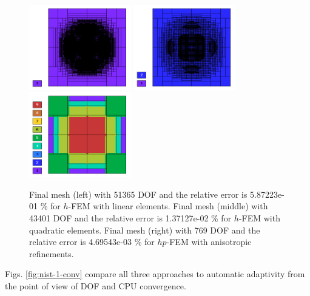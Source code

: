 \documentclass[12pt]{elsarticle}
\begin{document}
\begin{figure}[!ht]
\centering
\vspace{-7mm}
\includegraphics[height=3.7cm]{nist/nist-1/mesh_h1_aniso.png}
\includegraphics[height=3.7cm]{nist/nist-1/mesh_h2_aniso.png}
\includegraphics[height=3.7cm]{nist/nist-1/mesh_hp_aniso.png}
\vspace{-3mm}
\caption{
Final mesh (left) with 51365 DOF and the relative error is 5.87223e-01 \% for $h$-FEM with linear elements.
Final mesh (middle) with 43401 DOF and the relative error is 1.37127e-02 \% for $h$-FEM with quadratic elements. Final mesh (right) with 769 DOF and the relative error is 4.69543e-03 \% for $hp$-FEM with anisotropic refinements.}
\label{fig:nist-1-hp-aniso}
\vspace{-3mm}
\end{figure}

Figs. \ref{fig:nist-1-conv} compare all
three approaches to automatic adaptivity from the point
of view of DOF and CPU convergence.
\end{document}
